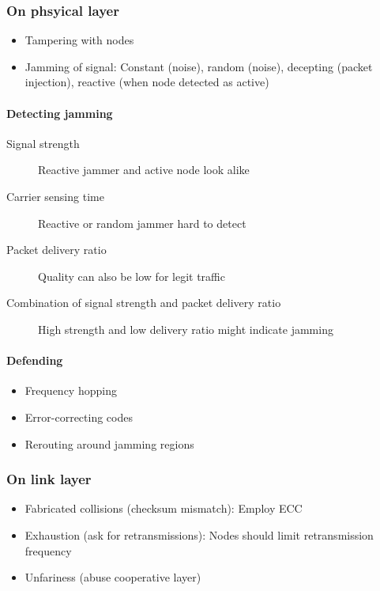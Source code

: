 \subsubsection{On phsyical layer}

\begin{itemize}
		\item Tampering with nodes
		\item Jamming of signal: Constant (noise), random (noise), decepting (packet injection), reactive (when node detected as active)
\end{itemize}

\paragraph{Detecting jamming}

\begin{description}
		\item[Signal strength] Reactive jammer and active node look alike
		\item[Carrier sensing time] Reactive or random jammer hard to detect
		\item[Packet delivery ratio] Quality can also be low for legit traffic
		\item[Combination of signal strength and packet delivery ratio] High
				strength and low delivery ratio might indicate jamming
\end{description}

\paragraph{Defending}

\begin{itemize}
		\item Frequency hopping
		\item Error-correcting codes
		\item Rerouting around jamming regions
\end{itemize}

\subsubsection{On link layer}

\begin{itemize}
		\item Fabricated collisions (checksum mismatch): Employ ECC
		\item Exhaustion (ask for retransmissions): Nodes should limit retransmission frequency
		\item Unfariness (abuse cooperative layer)
\end{itemize}

